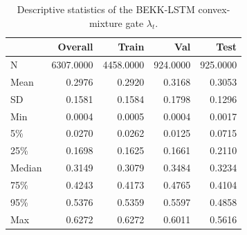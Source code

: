 \begin{table}
\caption{Descriptive statistics of the BEKK-LSTM convex-mixture gate $\lambda_t$.}
\label{tab:bekk_lstm_mix_alpha_all_2026_05_03_seed42_describe}
\begin{tabular}{lrrrr}
\toprule
 & Overall & Train & Val & Test \\
\midrule
N & 6307.0000 & 4458.0000 & 924.0000 & 925.0000 \\
Mean & 0.2976 & 0.2920 & 0.3168 & 0.3053 \\
SD & 0.1581 & 0.1584 & 0.1798 & 0.1296 \\
Min & 0.0004 & 0.0005 & 0.0004 & 0.0017 \\
5\% & 0.0270 & 0.0262 & 0.0125 & 0.0715 \\
25\% & 0.1698 & 0.1625 & 0.1661 & 0.2110 \\
Median & 0.3149 & 0.3079 & 0.3484 & 0.3234 \\
75\% & 0.4243 & 0.4173 & 0.4765 & 0.4104 \\
95\% & 0.5376 & 0.5359 & 0.5597 & 0.4858 \\
Max & 0.6272 & 0.6272 & 0.6011 & 0.5616 \\
\bottomrule
\end{tabular}
\end{table}
